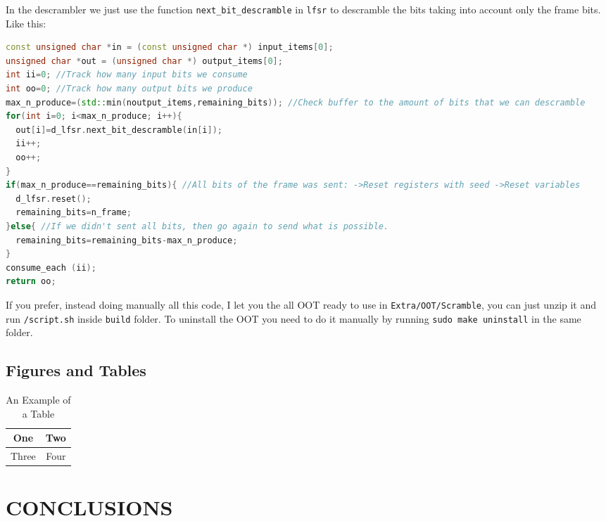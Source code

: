 \documentclass[a4paper, 10pt, conference]{ieeeconf}      %
\begin{document}
    In the descrambler we just use the function \verb|next_bit_descramble| in \verb|lfsr| to descramble the bits taking into account only the frame bits. Like this:
    

\begin{lstlisting}[language=c++, breaklines]
const unsigned char *in = (const unsigned char *) input_items[0];
unsigned char *out = (unsigned char *) output_items[0];
int ii=0; //Track how many input bits we consume
int oo=0; //Track how many output bits we produce
max_n_produce=(std::min(noutput_items,remaining_bits)); //Check buffer to the amount of bits that we can descramble
for(int i=0; i<max_n_produce; i++){
  out[i]=d_lfsr.next_bit_descramble(in[i]);
  ii++;
  oo++;
}
if(max_n_produce==remaining_bits){ //All bits of the frame was sent: ->Reset registers with seed ->Reset variables
  d_lfsr.reset();
  remaining_bits=n_frame;
}else{ //If we didn't sent all bits, then go again to send what is possible. 
  remaining_bits=remaining_bits-max_n_produce;
}    
consume_each (ii);
return oo;
\end{lstlisting}   

If you prefer, instead doing manually all this code, I let you the all OOT ready to use in \verb|Extra/OOT/Scramble|, you can just unzip it and run \verb|/script.sh| inside \verb|build| folder. To uninstall the OOT you need to do it manually by running \verb|sudo make uninstall| in the same folder.

\subsection{Figures and Tables}

\begin{table}[h]
\caption{An Example of a Table}
\label{table_example}
\begin{center}
\begin{tabular}{|c||c|}
\hline
One & Two\\
\hline
Three & Four\\
\hline
\end{tabular}
\end{center}
\end{table}

\section{CONCLUSIONS}



\end{document}
